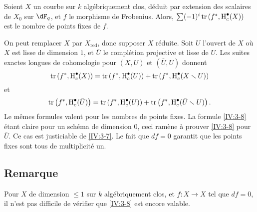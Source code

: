 \begin{corollary_}\label{IV:3-8}
Soient $X$ un courbe sur $k$ algébriquement clos, déduit par extension des 
scalaires de $X_0$ sur $\dF_q$, et $f$ le morphisme de Frobenius. Alors, 
$\sum (-1)^i \operatorname{tr}\left(f^\ast,\operatorname{H}_c^\bullet(X)\right)$ est le nombre de points 
fixes de $f$.
\end{corollary_}

On peut remplacer $X$ par $X_\text{red}$, donc supposer $X$ réduite. Soit $U$ 
l'ouvert de $X$ où $X$ est lisse de dimension $1$, et $\bar U$ le 
complétion projective et lisse de $U$. Les suites exactes longues de 
cohomologie pour $(X,U)$ et $(\bar U,U)$ donnent 
\[
  \operatorname{tr}\left(f^\ast,\operatorname{H}_c^\bullet(X)\right) = \operatorname{tr}\left(f^\ast,\operatorname{H}_c^\bullet(U)\right) + \operatorname{tr}\left(f^\ast,\operatorname{H}_c^\bullet(X\smallsetminus U)\right) 
\]
et
\[
  \operatorname{tr}\left(f^\ast,\operatorname{H}_c^\bullet(\bar U)\right) = \operatorname{tr}\left(f^\ast,\operatorname{H}_c^\bullet(U)\right) + \operatorname{tr}\left(f^\ast,\operatorname{H}_c^\bullet(\bar U\smallsetminus U)\right) \text{.}
\]
Le mêmes formules valent pour les nombres de points fixes. La formule 
\ref{IV:3-8} étant claire pour un schéma de dimension $0$, ceci ramène 
à prouver \ref{IV:3-8} pour $\bar U$. Ce cas est justiciable de \ref{IV:3-7}. 
Le fait que $d f=0$ garantit que les points fixes sont tous de 
multiplicité un. 





\subsection{Remarque}\label{IV:3-9}

Pour $X$ de dimension $\leqslant 1$ sur $k$ algébriquement clos, et 
$f:X\to X$ tel que $d f=0$, il n'est pas difficile de vérifier que 
\ref{IV:3-8} est encore valable. 


